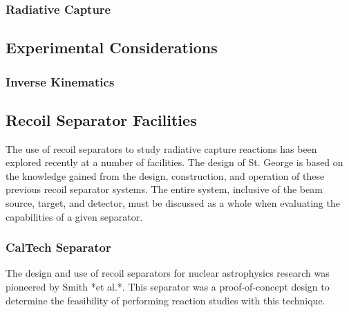 \subsubsection{Radiative Capture}
\subsection{Experimental Considerations}
\subsubsection{Inverse Kinematics}
\subsection{Recoil Separator Facilities}
The use of recoil separators to study radiative capture reactions has been
explored recently at a number of facilities. The design of St. George is based
on the knowledge gained from the design, construction, and operation of these
previous recoil separator systems. The entire system, inclusive of the beam
source, target, and detector, must be discussed as a whole when evaluating the
capabilities of a given separator.

\subsubsection{CalTech Separator}

The design and use of recoil separators for nuclear astrophysics research was
pioneered by Smith *et al.*. This separator was a proof-of-concept design to
determine the feasibility of performing reaction studies with this technique.

